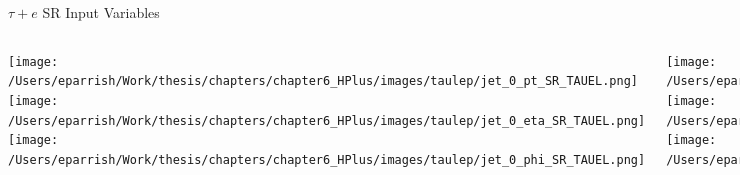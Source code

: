 \documentclass[aspectratio=169,xcolor=table]{beamer}
\begin{document}
    \begin{frame}[t]{$\tau+e$ SR Input Variables}
      \begin{columns}[t]
          \texttt{[image: /Users/eparrish/Work/thesis/chapters/chapter6\_HPlus/images/taulep/jet\_0\_pt\_SR\_TAUEL.png]}
          \texttt{[image: /Users/eparrish/Work/thesis/chapters/chapter6\_HPlus/images/taulep/jet\_0\_eta\_SR\_TAUEL.png]}
          \texttt{[image: /Users/eparrish/Work/thesis/chapters/chapter6\_HPlus/images/taulep/jet\_0\_phi\_SR\_TAUEL.png]}

          \texttt{[image: /Users/eparrish/Work/thesis/chapters/chapter6\_HPlus/images/taulep/lep\_0\_pt\_SR\_TAUEL.png]}
          \texttt{[image: /Users/eparrish/Work/thesis/chapters/chapter6\_HPlus/images/taulep/lep\_0\_eta\_SR\_TAUEL.png]}
          \texttt{[image: /Users/eparrish/Work/thesis/chapters/chapter6\_HPlus/images/taulep/lep\_0\_phi\_SR\_TAUEL.png]}

          \texttt{[image: /Users/eparrish/Work/thesis/chapters/chapter6\_HPlus/images/taulep/el\_0\_pt\_SR\_TAUEL.png]}
          \texttt{[image: /Users/eparrish/Work/thesis/chapters/chapter6\_HPlus/images/taulep/el\_0\_eta\_SR\_TAUEL.png]}
          \texttt{[image: /Users/eparrish/Work/thesis/chapters/chapter6\_HPlus/images/taulep/el\_0\_phi\_SR\_TAUEL.png]}

          \texttt{[image: /Users/eparrish/Work/thesis/chapters/chapter6\_HPlus/images/taulep/mu\_0\_pt\_SR\_TAUEL.png]}
          \texttt{[image: /Users/eparrish/Work/thesis/chapters/chapter6\_HPlus/images/taulep/mu\_0\_eta\_SR\_TAUEL.png]}
          \texttt{[image: /Users/eparrish/Work/thesis/chapters/chapter6\_HPlus/images/taulep/mu\_0\_phi\_SR\_TAUEL.png]}

      \end{columns}
    \end{frame}
\end{document}
